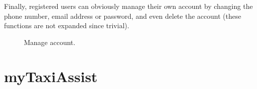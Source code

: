 Finally, registered users can obviously manage their own account by changing the phone number, email address or password, and even delete the account (these functions are not expanded since trivial).

\begin{figure}%
	\hfill%
	\hfill%
	\caption{Manage account.}\label{fig:manageAccount}
\end{figure}

\newpage

\section{myTaxiAssist}

\lipsum[1-2]
